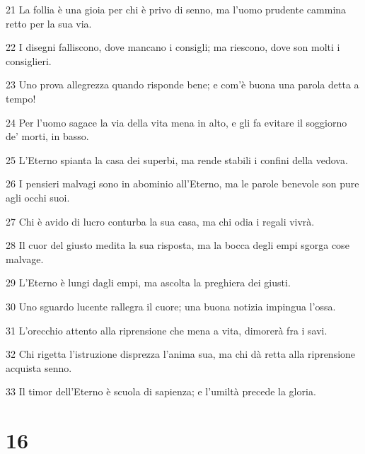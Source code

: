 \par 21 La follia è una gioia per chi è privo di senno, ma l'uomo prudente cammina retto per la sua via.
\par 22 I disegni falliscono, dove mancano i consigli; ma riescono, dove son molti i consiglieri.
\par 23 Uno prova allegrezza quando risponde bene; e com'è buona una parola detta a tempo!
\par 24 Per l'uomo sagace la via della vita mena in alto, e gli fa evitare il soggiorno de' morti, in basso.
\par 25 L'Eterno spianta la casa dei superbi, ma rende stabili i confini della vedova.
\par 26 I pensieri malvagi sono in abominio all'Eterno, ma le parole benevole son pure agli occhi suoi.
\par 27 Chi è avido di lucro conturba la sua casa, ma chi odia i regali vivrà.
\par 28 Il cuor del giusto medita la sua risposta, ma la bocca degli empi sgorga cose malvage.
\par 29 L'Eterno è lungi dagli empi, ma ascolta la preghiera dei giusti.
\par 30 Uno sguardo lucente rallegra il cuore; una buona notizia impingua l'ossa.
\par 31 L'orecchio attento alla riprensione che mena a vita, dimorerà fra i savi.
\par 32 Chi rigetta l'istruzione disprezza l'anima sua, ma chi dà retta alla riprensione acquista senno.
\par 33 Il timor dell'Eterno è scuola di sapienza; e l'umiltà precede la gloria.

\chapter{16}

